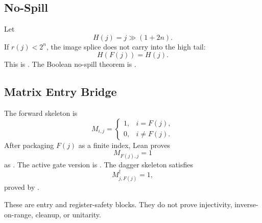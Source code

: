 \subsection{No-Spill}

Let
\[
  H(j)=j\gg(1+2n).
\]
If \(r(j)<2^n\), the image splice does not carry into the high tail:
\[
  H(F(j))=H(j).
\]
This is .
The Boolean no-spill theorem is
.

\subsection{Matrix Entry Bridge}

The forward skeleton is
\[
  M_{i,j}=
  \begin{cases}
  1, & i=F(j),\\
  0, & i\ne F(j).
  \end{cases}
\]
After packaging \(F(j)\) as a finite index, Lean proves
\[
  M_{F(j),j}=1
\]
as .  The active gate
version is .  The dagger
skeleton satisfies
\[
  M^\dagger_{j,F(j)}=1,
\]
proved by .

These are entry and register-safety blocks.  They do not prove injectivity,
inverse-on-range, cleanup, or unitarity.
